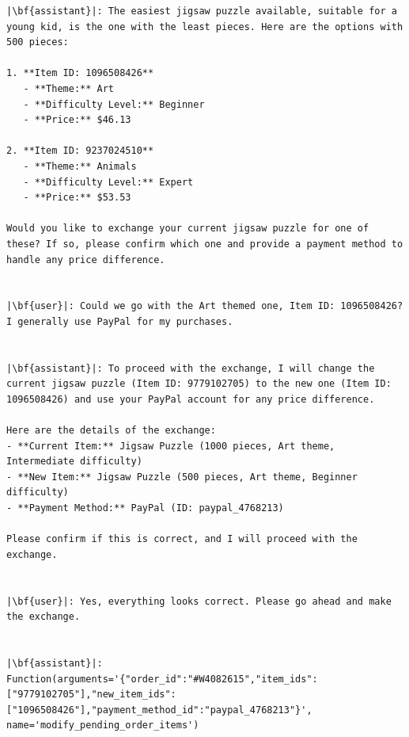 \begin{verbatim}
|\bf{assistant}|: The easiest jigsaw puzzle available, suitable for a young kid, is the one with the least pieces. Here are the options with 500 pieces:

1. **Item ID: 1096508426**
   - **Theme:** Art
   - **Difficulty Level:** Beginner
   - **Price:** $46.13

2. **Item ID: 9237024510**
   - **Theme:** Animals
   - **Difficulty Level:** Expert
   - **Price:** $53.53

Would you like to exchange your current jigsaw puzzle for one of these? If so, please confirm which one and provide a payment method to handle any price difference.


|\bf{user}|: Could we go with the Art themed one, Item ID: 1096508426? I generally use PayPal for my purchases.


|\bf{assistant}|: To proceed with the exchange, I will change the current jigsaw puzzle (Item ID: 9779102705) to the new one (Item ID: 1096508426) and use your PayPal account for any price difference.

Here are the details of the exchange:
- **Current Item:** Jigsaw Puzzle (1000 pieces, Art theme, Intermediate difficulty)
- **New Item:** Jigsaw Puzzle (500 pieces, Art theme, Beginner difficulty)
- **Payment Method:** PayPal (ID: paypal_4768213)

Please confirm if this is correct, and I will proceed with the exchange.


|\bf{user}|: Yes, everything looks correct. Please go ahead and make the exchange.


|\bf{assistant}|: Function(arguments='{"order_id":"#W4082615","item_ids":["9779102705"],"new_item_ids":["1096508426"],"payment_method_id":"paypal_4768213"}', name='modify_pending_order_items')



\end{verbatim}
